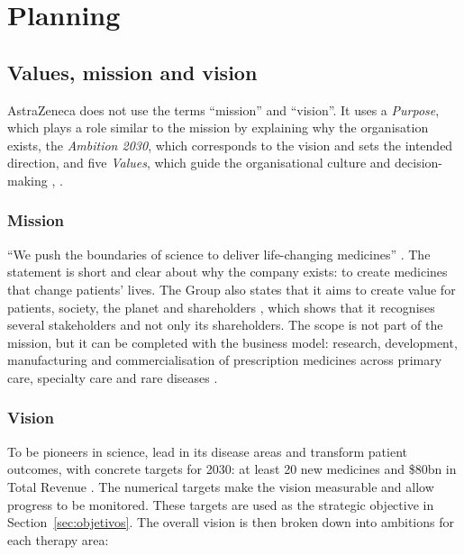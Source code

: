 \chapter{Planning}

\section{Values, mission and vision}
AstraZeneca does not use the terms ``mission'' and ``vision''. It uses a \textit{Purpose}, which plays a role similar to the mission by explaining why the organisation exists, the \textit{Ambition 2030}, which corresponds to the vision and sets the intended direction, and five \textit{Values}, which guide the organisational culture and decision-making \cite[pp.~8, 10]{AR}, \cite[pp.~15--16]{PLAN}.

\subsection{Mission}
``We push the boundaries of science to deliver life-changing medicines'' \cite[p.~8]{AR}. The statement is short and clear about why the company exists: to create medicines that change patients' lives. The Group also states that it aims to create value for patients, society, the planet and shareholders \cite[p.~8]{AR}, which shows that it recognises several stakeholders and not only its shareholders. The scope is not part of the mission, but it can be completed with the business model: research, development, manufacturing and commercialisation of prescription medicines across primary care, specialty care and rare diseases \cite[p.~8]{AR}.

\subsection{Vision}
To be pioneers in science, lead in its disease areas and transform patient outcomes, with concrete targets for 2030: at least 20 new medicines and \$80bn in Total Revenue \cite[p.~10]{AR}. The numerical targets make the vision measurable and allow progress to be monitored. These targets are used as the strategic objective in Section~\ref{sec:objetivos}. The overall vision is then broken down into ambitions for each therapy area:

